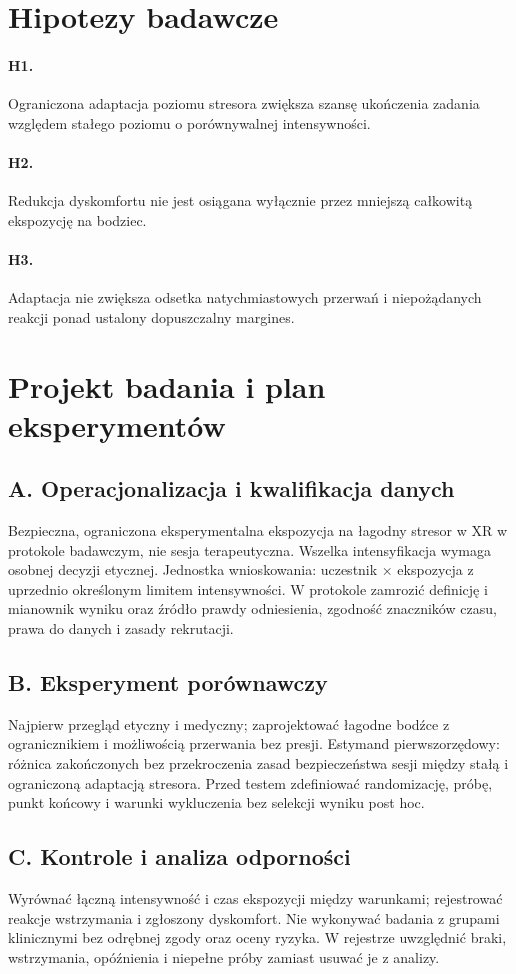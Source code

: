 \documentclass[11pt,a4paper]{article}
\begin{document}
\section{Hipotezy badawcze}
\paragraph{H1.} Ograniczona adaptacja poziomu stresora zwiększa szansę ukończenia zadania względem stałego poziomu o porównywalnej intensywności.
\paragraph{H2.} Redukcja dyskomfortu nie jest osiągana wyłącznie przez mniejszą całkowitą ekspozycję na bodziec.
\paragraph{H3.} Adaptacja nie zwiększa odsetka natychmiastowych przerwań i niepożądanych reakcji ponad ustalony dopuszczalny margines.
\section{Projekt badania i plan eksperymentów}
\subsection{A. Operacjonalizacja i kwalifikacja danych}
Bezpieczna, ograniczona eksperymentalna ekspozycja na łagodny stresor w XR w protokole badawczym, nie sesja terapeutyczna. Wszelka intensyfikacja wymaga osobnej decyzji etycznej. Jednostka wnioskowania: uczestnik × ekspozycja z uprzednio określonym limitem intensywności. W protokole zamrozić definicję i mianownik wyniku oraz źródło prawdy odniesienia, zgodność znaczników czasu, prawa do danych i zasady rekrutacji.
\subsection{B. Eksperyment porównawczy}
Najpierw przegląd etyczny i medyczny; zaprojektować łagodne bodźce z ogranicznikiem i możliwością przerwania bez presji. Estymand pierwszorzędowy: różnica zakończonych bez przekroczenia zasad bezpieczeństwa sesji między stałą i ograniczoną adaptacją stresora. Przed testem zdefiniować randomizację, próbę, punkt końcowy i warunki wykluczenia bez selekcji wyniku post hoc.
\subsection{C. Kontrole i analiza odporności}
Wyrównać łączną intensywność i czas ekspozycji między warunkami; rejestrować reakcje wstrzymania i zgłoszony dyskomfort. Nie wykonywać badania z grupami klinicznymi bez odrębnej zgody oraz oceny ryzyka. W rejestrze uwzględnić braki, wstrzymania, opóźnienia i niepełne próby zamiast usuwać je z analizy.
\end{document}
